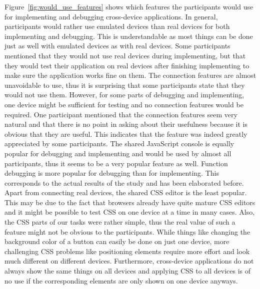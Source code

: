 Figure~\ref{fig:would_use_features} shows which features the participants would use for implementing and debugging cross-device applications. In general, participants would rather use emulated devices than real devices for both implementing and debugging. This is understandable as most things can be done just as well with emulated devices as with real devices. Some participants mentioned that they would not use real devices during implementing, but that they would test their application on real devices after finishing implementing to make sure the application works fine on them. The connection features are almost unavoidable to use, thus it is surprising that some participants state that they would not use them. However, for some parts of debugging and implementing, one device might be sufficient for testing and no connection features would be required. One participant mentioned that the connection features seem very natural and that there is no point in asking about their usefulness because it is obvious that they are useful. This indicates that the feature was indeed greatly appreciated by some participants. The shared JavaScript console is equally popular for debugging and implementing and would be used by almost all participants, thus it seems to be a very popular feature as well. Function debugging is more popular for debugging than for implementing. This corresponds to the actual results of the study and has been elaborated before. Apart from connecting real devices, the shared CSS editor is the least popular. This may be due to the fact that browsers already have quite mature CSS editors and it might be possible to test CSS on one device at a time in many cases. Also, the CSS parts of our tasks were rather simple, thus the real value of such a feature might not be obvious to the participants. While things like changing the background color of a button can easily be done on just one device, more challenging CSS problems like positioning elements require more effort and look much different on different devices. Furthermore, cross-device applications do not always show the same things on all devices and applying CSS to all devices is of no use if the corresponding elements are only shown on one device anyways.

